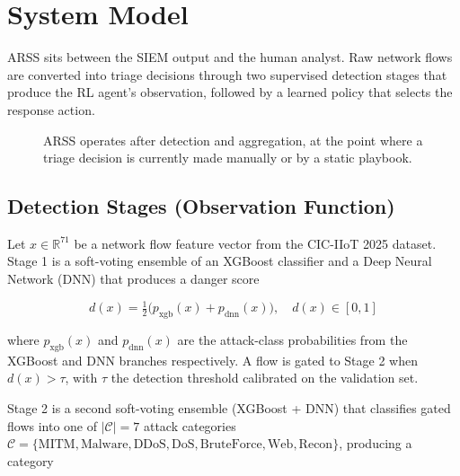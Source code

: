 \documentclass[conference]{IEEEtran}
\newcommand{\danger}{d}
\begin{document}
\section{System Model}

ARSS sits between the SIEM output and the human analyst. Raw network flows are converted into triage decisions through two supervised detection stages that produce the RL agent's observation, followed by a learned policy that selects the response action.

\begin{figure}[H]
    \centering
    \caption{ARSS operates after detection and aggregation, at the point where a triage decision is currently made manually or by a static playbook.}
    \label{fig:pipeline}
\end{figure}

\subsection{Detection Stages (Observation Function)}

Let $x \in \mathbb{R}^{71}$ be a network flow feature vector from the CIC-IIoT 2025 dataset. Stage 1 is a soft-voting ensemble of an XGBoost classifier \cite{xgboost2016} and a Deep Neural Network (DNN) that produces a danger score

\begin{equation}
\danger(x) = \tfrac{1}{2}\big(p_{\text{xgb}}(x) + p_{\text{dnn}}(x)\big), \quad \danger(x) \in [0,1]
\end{equation}

where $p_{\text{xgb}}(x)$ and $p_{\text{dnn}}(x)$ are the attack-class probabilities from the XGBoost and DNN branches respectively. A flow is gated to Stage 2 when $\danger(x) > \tau$, with $\tau$ the detection threshold calibrated on the validation set.

Stage 2 is a second soft-voting ensemble (XGBoost + DNN) that classifies gated flows into one of $|\mathcal{C}|=7$ attack categories $\mathcal{C} = \{\text{MITM}, \text{Malware}, \text{DDoS}, \text{DoS}, \text{BruteForce}, \text{Web}, \text{Recon}\}$, producing a category
\end{document}
